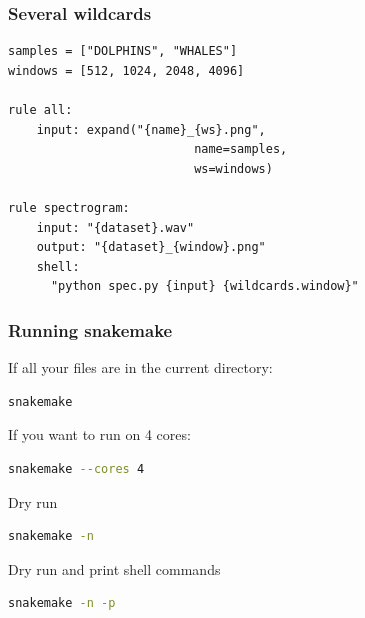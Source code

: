 \documentclass{beamer}
\begin{document}
      
\begin{frame}[fragile]
\frametitle{Several wildcards}
   \begin{minipage}{12cm}
  \begin{block}{}
            \begin{lstlisting}[basicstyle=\large]
samples = ["DOLPHINS", "WHALES"]
windows = [512, 1024, 2048, 4096]

rule all:
    input: expand("{name}_{ws}.png", 
                          name=samples, 
                          ws=windows)

rule spectrogram:
    input: "{dataset}.wav"
    output: "{dataset}_{window}.png"
    shell: 
      "python spec.py {input} {wildcards.window}"
            \end{lstlisting}
  \end{block}
\end{minipage}
\end{frame}
  
        

\begin{frame}[fragile]
    \frametitle{Running snakemake}
      If all your files are in the current directory:
            \begin{lstlisting}[language=bash]
            snakemake
            \end{lstlisting}
      If you want to run on 4 cores:
            
            \begin{lstlisting}[language=bash]
            snakemake --cores 4
            \end{lstlisting}
      Dry run      
            \begin{lstlisting}[language=bash]            
            snakemake -n
            \end{lstlisting}
      Dry run and print shell commands
            
	  \begin{lstlisting}[language=bash]            
            snakemake -n -p
          \end{lstlisting}  
                
\end{frame}

\end{document}
